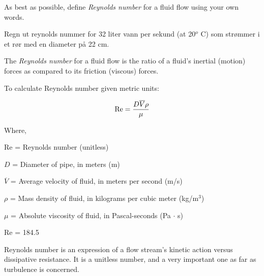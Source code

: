 

As best as possible, define {\it Reynolds number} for a fluid flow using your own words.

\vskip 10pt

Regn ut reynolds nummer for 32 liter vann per sekund (at 20$^{o}$ C) som strømmer i et rør med en diameter på 22 cm. 








The {\it Reynolds number} for a fluid flow is the ratio of a fluid's inertial (motion) forces as compared to its friction (viscous) forces.

\vskip 30pt
 
To calculate Reynolds number given metric units:

$$\hbox{Re} = {{D \overline{V} \rho} \over \mu}$$

\noindent
Where,

Re = Reynolds number (unitless)

$D$ = Diameter of pipe, in meters (m)

$\overline{V}$ = Average velocity of fluid, in meters per second (m/s)

$\rho$ = Mass density of fluid, in kilograms per cubic meter (kg/m$^{3}$)

$\mu$ = Absolute viscosity of fluid, in Pascal-seconds (Pa $\cdot$ s)

\vskip 60pt \goodbreak

Re = 184.5







Reynolds number is an expression of a flow stream's kinetic action versus dissipative resistance.  It is a unitless number, and a very important one as far as turbulence is concerned.





